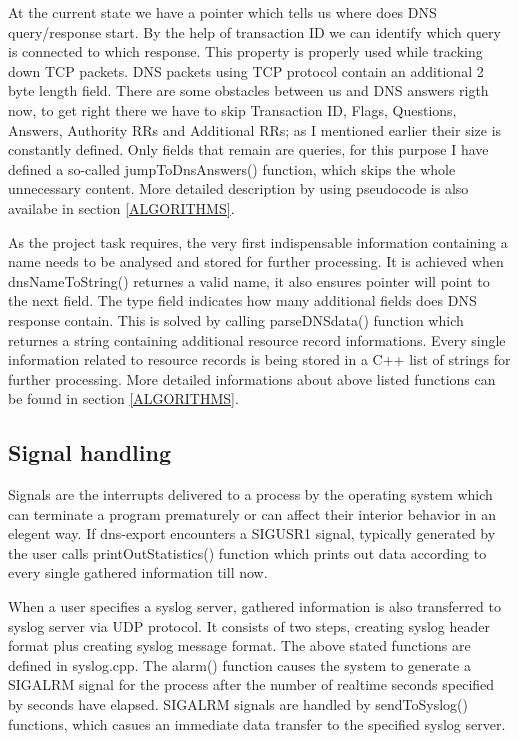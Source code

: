 \documentclass[11pt,a4paper]{article}
\begin{document}
At the current state we have a pointer which tells us where does DNS query/response start. By the help of transaction ID we can identify which query is connected to which response. This property is properly used while tracking down TCP packets. DNS packets using TCP protocol contain an additional 2 byte length field. There are some obstacles between us and DNS answers rigth now, to get right there we have to skip Transaction ID, Flags, Questions, Answers, Authority RRs and Additional RRs; as I mentioned earlier their size is constantly defined. Only fields that remain are queries, for this purpose I have defined a so-called jumpToDnsAnswers() function, which skips the whole unnecessary content. More detailed description by using pseudocode is also availabe in section \ref{ALGORITHMS}.

As the project task requires, the very first indispensable information containing a name needs to be analysed and stored for further processing. It is achieved when dnsNameToString() returnes a valid name, it also ensures pointer will point to the next field. The type field indicates how many additional fields does DNS response contain. This is solved by calling parseDNSdata() function which returnes a string containing additional resource record informations. Every single information related to resource records is being stored in a C++ list of strings for further processing. More detailed informations about above listed functions can be found in section \ref{ALGORITHMS}.

\subsection{Signal handling}
Signals are the interrupts delivered to a process by the operating system which can terminate a program prematurely or can affect their interior behavior in an elegent way. If dns-export encounters a SIGUSR1 signal, typically generated by the user calls printOutStatistics() function which prints out data according to every single gathered information till now.

When a user specifies a syslog server, gathered information is also transferred to syslog server via UDP protocol. It consists of two steps, creating syslog header format plus creating syslog message format. The above stated functions are defined in syslog.cpp. The alarm() function causes the system to generate a SIGALRM signal for the process after the number of realtime seconds specified by seconds have elapsed. SIGALRM signals are handled by sendToSyslog() functions, which casues an immediate data transfer to the specified syslog server.
\end{document}
